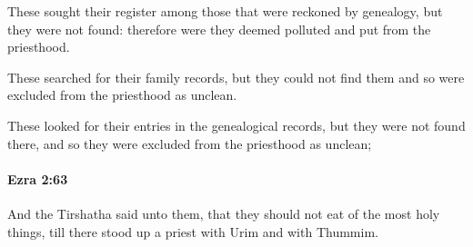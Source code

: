 			\begin{versebox}
					\item[BHS] 
					\item[LXX] 
					\item[ASV] These sought their register among those that were reckoned by genealogy, but they were not found: therefore were they deemed polluted and put from the priesthood.
					\item[NIV] These searched for their family records, but they could not find them and so were excluded from the priesthood as unclean.
					\item[NRSV] These looked for their entries in the genealogical records, but they were not found there, and so they were excluded from the priesthood as unclean;
			\end{versebox}

		\paragraph{Ezra 2:63} %
			\label{EZRA-2-63}

			And the Tirshatha said unto them, that they should not eat of the most holy things, till there stood up a priest with Urim and with Thummim.

